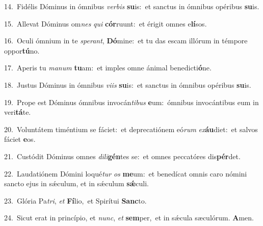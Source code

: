 {\numbfont\textcolor{\numbcolor}{14.}}~Fidélis Dóminus in ómnibus \textit{ver}\-\textit{bis} \textbf{su}\-is:~\star et sanctus in ómnibus opéribus \textbf{su}\-is.\par
{\numbfont\textcolor{\numbcolor}{15.}}~Allevat Dóminus om\textit{nes} \textit{qui} \textbf{cór}\-ruunt:~\star et érigit omnes e\-\textbf{lí}\-sos.\par
{\numbfont\textcolor{\numbcolor}{16.}}~Oculi ómnium in te \textit{spe}\-\textit{rant}, \textbf{Dó}\-mine:~\star et tu das escam illórum in témpore oppor\-\textbf{tú}\-no.\par
{\numbfont\textcolor{\numbcolor}{17.}}~Aperis tu \textit{ma}\-\textit{num} \textbf{tu}\-am:~\star et imples omne ánimal benedicti\-\textbf{ó}\-ne.\par
{\numbfont\textcolor{\numbcolor}{18.}}~Justus Dóminus in ómnibus \textit{vi}\-\textit{is} \textbf{su}\-is:~\star et sanctus in ómnibus opéribus \textbf{su}\-is.\par
{\numbfont\textcolor{\numbcolor}{19.}}~Prope est Dóminus ómnibus invocán\-\textit{ti}\-\textit{bus} \textbf{e}\-um:~\star ómnibus invocántibus eum in veri\-\textbf{tá}\-te.\par
{\numbfont\textcolor{\numbcolor}{20.}}~Voluntátem timéntium se fáciet:~\dagger et deprecatiónem eó\textit{rum} \textit{ex}\-\textbf{áu}diet:~\star et salvos fáciet \textbf{e}\-os.\par
{\numbfont\textcolor{\numbcolor}{21.}}~Custódit Dóminus omnes \textit{di}\-\textit{li}\textbf{gén}tes se:~\star et omnes peccatóres dis\-\textbf{pér}\-det.\par
{\numbfont\textcolor{\numbcolor}{22.}}~Laudatiónem Dómini loqué\textit{tur} \textit{os} \textbf{me}\-um:~\star et benedícat omnis caro nómini sancto ejus in sǽculum, et in sǽculum \textbf{sǽ}\-culi.\par
{\numbfont\textcolor{\numbcolor}{23.}}~Glória Pa\-\textit{tri}\-, \textit{et} \textbf{Fí}\-lio,~\star et Spirítui \textbf{Sanc}\-to.\par
{\numbfont\textcolor{\numbcolor}{24.}}~Sicut erat in princípio, et \textit{nunc}\-, \textit{et} \textbf{sem}\-per,~\star et in sǽcula sæculórum. \textbf{A}\-men.\par
